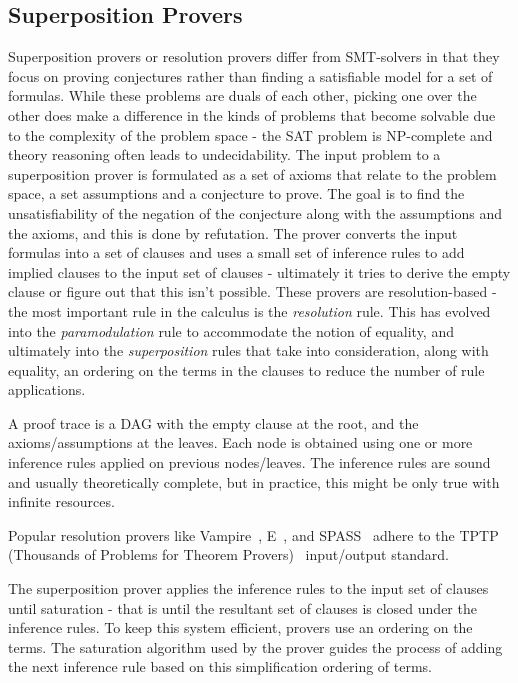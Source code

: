 \documentclass{article}
\begin{document}
	\subsection{Superposition Provers}
	\label{sup}
	Superposition provers or resolution provers differ 
	from SMT-solvers in that they focus on proving 
	conjectures rather than finding a satisfiable model
	for a set of formulas. While these problems are 
	duals of each other, picking one over the other 
	does make a difference in the kinds of problems 
	that become solvable due to the complexity of 
	the problem space - the SAT problem is NP-complete
	and theory reasoning often leads to undecidability.
	The input problem to a superposition prover is 
	formulated as a set of axioms that relate to the 
	problem space, a set assumptions and a conjecture 
	to prove. The goal is to find the unsatisfiability 
	of the negation of the conjecture along with the 
	assumptions and the axioms, and this is done 
	by refutation. The prover converts 
	the input formulas into a set of clauses and 
	uses a small set of inference rules to add 
	implied clauses to the input set of 
	clauses - ultimately it tries to derive 
	the empty clause or figure out that this 
	isn't possible. These provers are resolution-based -
	the most important rule in the calculus is the 
	\textit{resolution} rule. This has evolved into 
	the \textit{paramodulation} rule to accommodate 
	the notion of equality, and ultimately into 
	the \textit{superposition} rules that take into 
	consideration, along with equality, an ordering 
	on the terms in the clauses to reduce the number 
	of rule applications.
	
	A proof trace is a DAG with the empty clause at
	the root, and the axioms/assumptions at the leaves. 
	Each node is obtained using one or more inference
	rules applied on previous nodes/leaves. The 
	inference rules are sound and usually theoretically 
	complete, but in practice, this might be only true 
	with infinite resources.
	
	Popular resolution provers like 
	Vampire~\cite{10.1007/978-3-642-39799-8_1}, 
	E~\cite{10.5555/1218615.1218621}, and 
	SPASS~\cite{10.1007/978-3-642-02959-2_10} adhere 
	to the TPTP (Thousands of Problems 
	for Theorem 
	Provers)~\cite{Sut17} input/output standard.
	
	The superposition prover applies the inference 
	rules to the input set of 
	clauses until saturation - that is until the 
	resultant set of clauses is closed under the 
	inference rules. To keep this system
	efficient, provers use an ordering 
	on the terms. The saturation algorithm used 
	by the prover guides the process of adding the 
	next inference rule based on this simplification 
	ordering of terms.
	
\end{document}
